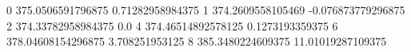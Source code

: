 0 375.0506591796875 0.71282958984375
1 374.2609558105469 -0.076873779296875
2 374.33782958984375 0.0
4 374.46514892578125 0.1273193359375
6 378.04608154296875 3.708251953125
8 385.3480224609375 11.01019287109375

